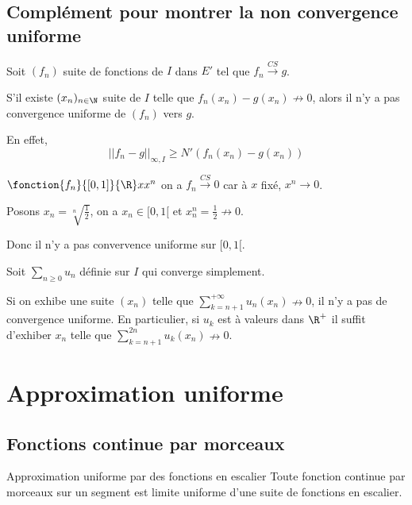 \subsection{Complément pour montrer la non convergence uniforme}

\begin{proposition}{}{}
    Soit $(f_n)$ suite de fonctions de $I$ dans $E'$ tel que $f_n \xrightarrow{CS} g$. 

    S'il existe $(x_n)_{n \in \N}$ suite de $I$ telle que 
    $f_n(x_n) - g(x_n) \nrightarrow 0$, alors il n'y a pas convergence uniforme de $(f_n)$ vers $g$.

    En effet, $$||f_n - g||_{\infty, I} \geqslant N'(f_n(x_n) - g(x_n))$$
\end{proposition}

\begin{exemple}
    $\fonction{f_n}{[0, 1]}{\R} x {x^n}$ on a $f_n \xrightarrow{CS} 0$
    car à $x$ fixé, $x^n \to 0$.

    Posons $x_n = \sqrt[n]{\frac 1 2}$, on a $x_n \in [0, 1[$ et 
    $x_n^n = \frac 1 2 \nrightarrow 0$. 

    Donc il n'y a pas convervence uniforme sur $[0, 1[$. 
\end{exemple}


\begin{proposition}{}{}
    Soit $\sum_{n \geqslant 0} u_n$ définie sur $I$ qui converge simplement. 

    Si on exhibe une suite $(x_n)$ telle que $\displaystyle \sum_{k = n + 1 }^{+ \infty  } u_n(x_n) \nrightarrow 0$,
    il n'y a pas de convergence uniforme. En particulier, si $u_k$ est à valeurs dans $\R^+$ il suffit 
    d'exhiber $x_n$ telle que $\displaystyle \sum_{k = n + 1}^{2n} u_k(x_n) \nrightarrow 0$.
\end{proposition}


\section{Approximation uniforme }
\subsection{Fonctions continue par morceaux }

\begin{theorement}{Approximation uniforme par des fonctions en escalier}{}
    Toute fonction continue par morceaux sur un segment est limite uniforme d'une suite 
    de fonctions en escalier. 
\end{theorement}

